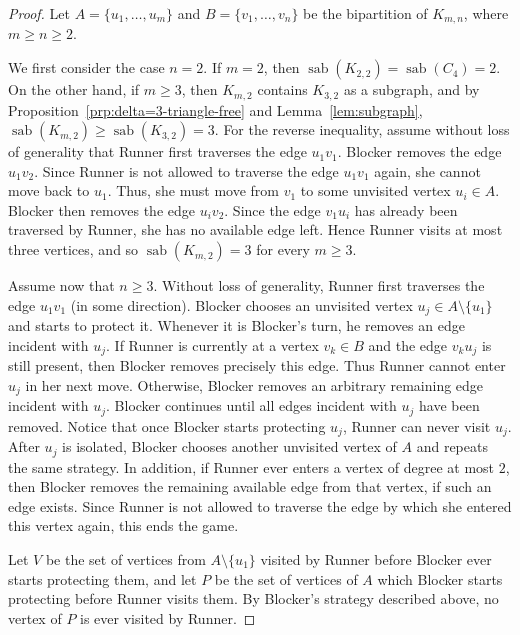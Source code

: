 \documentclass[10pt,a4paper]{amsart}
\DeclareMathOperator{\sab}{\mathrm{sab}}
\begin{document}
\begin{proof}
Let $A=\{u_1,\ldots,u_m\}$ and $B=\{v_1,\ldots,v_n\}$ be the bipartition of $K_{m,n}$, where $m\ge n\ge 2$.

We first consider the case $n=2$. If $m=2$, then $\sab(K_{2,2})=\sab(C_4)=2$. On the other hand, if $m\ge 3$, then $K_{m,2}$ contains $K_{3,2}$ as a subgraph, and by Proposition~\ref{prp:delta=3-triangle-free} and Lemma~\ref{lem:subgraph}, $\sab(K_{m,2})\ge \sab(K_{3,2})=3$. For the reverse inequality, assume without loss of generality that Runner first traverses the edge $u_1v_1$. Blocker removes the edge $u_1v_2$. Since Runner is not allowed to traverse the edge $u_1v_1$ again, she cannot move back to $u_1$. Thus, she must move from $v_1$ to some unvisited vertex $u_i\in A$. Blocker then removes the edge $u_iv_2$. Since the edge $v_1u_i$ has already been traversed by Runner, she has no available edge left. Hence Runner
visits at most three vertices, and so $\sab(K_{m,2})=3$ for every $m\ge 3$.

Assume now that $n\ge 3$. Without loss of generality, Runner first traverses
the edge $u_1v_1$ (in some direction). Blocker chooses an unvisited vertex
$u_j\in A\setminus\{u_1\}$ and starts to protect it. Whenever it is Blocker's turn,
he removes an edge incident with $u_j$. If Runner is currently at a vertex
$v_k\in B$ and the edge $v_ku_j$ is still present, then Blocker removes precisely
this edge. Thus Runner cannot enter $u_j$ in her next move. Otherwise, Blocker
removes an arbitrary remaining edge incident with $u_j$. Blocker continues until all edges incident with $u_j$ have been removed. Notice that once Blocker starts protecting $u_j$, Runner can never visit $u_j$. After $u_j$ is isolated, Blocker chooses another unvisited vertex of $A$ and repeats the same strategy. In addition, if Runner ever enters a vertex of degree at most $2$, then Blocker removes the remaining available edge from that vertex, if such an edge exists. Since Runner is not allowed to traverse the edge by which she entered this vertex again, this ends the game.

Let $V$ be the set of vertices from $A\setminus\{u_1\}$ visited by Runner before
Blocker ever starts protecting them, and let $P$ be the set of vertices of $A$ which
Blocker starts protecting before Runner visits them. By Blocker's strategy described above, no vertex of $P$ is ever visited by Runner.


\end{proof}
\end{document}
